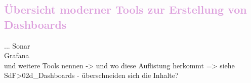 \subsection{\textcolor{Plum}{Übersicht moderner Tools zur Erstellung von Dashboards}}
\label{ch:SdF:UI:sec:moderne_DB_Tools}
...
Sonar\\
Grafana\\
und weitere Tools nennen -> und wo diese Auflistung herkommt
=> siehe SdF>02d\_Dashboards - überschneiden sich die Inhalte?
